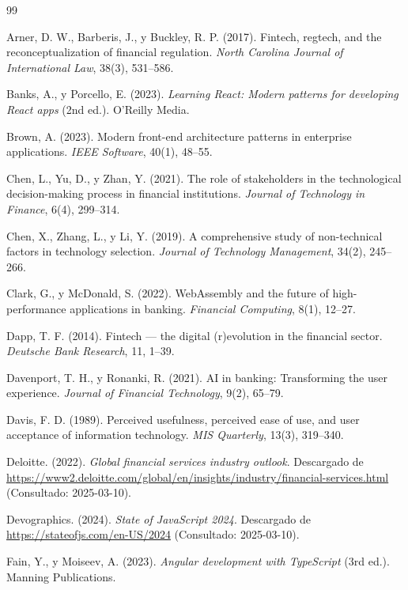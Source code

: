 \begin{thebibliography}{99}

 Arner, D. W., Barberis, J., y Buckley, R. P. (2017). Fintech, regtech, and the reconceptualization of financial regulation. \textit{North Carolina Journal of International Law}, 38(3), 531--586.

 Banks, A., y Porcello, E. (2023). \textit{Learning React: Modern patterns for developing React apps} (2nd ed.). O'Reilly Media.

 Brown, A. (2023). Modern front-end architecture patterns in enterprise applications. \textit{IEEE Software}, 40(1), 48--55.

 Chen, L., Yu, D., y Zhan, Y. (2021). The role of stakeholders in the technological decision-making process in financial institutions. \textit{Journal of Technology in Finance}, 6(4), 299--314.

 Chen, X., Zhang, L., y Li, Y. (2019). A comprehensive study of non-technical factors in technology selection. \textit{Journal of Technology Management}, 34(2), 245--266.

 Clark, G., y McDonald, S. (2022). WebAssembly and the future of high-performance applications in banking. \textit{Financial Computing}, 8(1), 12--27.

 Dapp, T. F. (2014). Fintech --- the digital (r)evolution in the financial sector. \textit{Deutsche Bank Research}, 11, 1--39.

 Davenport, T. H., y Ronanki, R. (2021). AI in banking: Transforming the user experience. \textit{Journal of Financial Technology}, 9(2), 65--79.

 Davis, F. D. (1989). Perceived usefulness, perceived ease of use, and user acceptance of information technology. \textit{MIS Quarterly}, 13(3), 319--340.

 Deloitte. (2022). \textit{Global financial services industry outlook}. Descargado de \url{https://www2.deloitte.com/global/en/insights/industry/financial-services.html} (Consultado: 2025-03-10).

 Devographics. (2024). \textit{State of JavaScript 2024}. Descargado de \url{https://stateofjs.com/en-US/2024} (Consultado: 2025-03-10).

 Fain, Y., y Moiseev, A. (2023). \textit{Angular development with TypeScript} (3rd ed.). Manning Publications.


\end{thebibliography}
